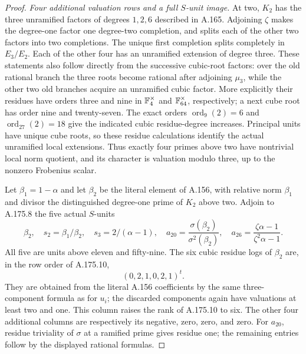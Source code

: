 \begin{proof}
\emph{Four additional valuation rows and a full $S$-unit image.}
At two, $K_2$ has the three unramified factors of degrees $1,2,6$
described in A.165.  Adjoining $\zeta$ makes the degree-one factor
one degree-two completion, and splits each of the other two factors
into two completions.  The unique first completion splits completely
in $E_3/E_2$.  Each of the other four has an unramified extension of
degree three.  These statements also follow directly from the
successive cubic-root factors: over the old rational branch the
three roots become rational after adjoining $\mu_3$, while the
other two old branches acquire an unramified cubic factor.
More explicitly their residues have orders three and nine in
$\mathbb F_4^\times$ and $\mathbb F_{64}^\times$, respectively; a next cube root
has order nine and twenty-seven.  The exact orders
$\operatorname{ord}_9(2)=6$ and $\operatorname{ord}_{27}(2)=18$
give the indicated cubic residue-degree increases.  Principal units
have unique cube roots, so these residue calculations identify the
actual unramified local extensions.
Thus exactly four primes above two have nontrivial local norm
quotient, and its character is valuation modulo three, up to the
nonzero Frobenius scalar.

Let $\beta_1=1-\alpha$ and let $\beta_2$ be the literal element of
A.156, with relative norm $\beta_1$ and divisor the distinguished
degree-one prime of $K_2$ above two.  Adjoin to A.175.8 the five
actual $S$-units
\[
 \beta_2,\quad s_2=\beta_1/\beta_2,\quad
 s_3=2/(\alpha-1),\quad
 a_{20}=\frac{\sigma(\beta_2)}{\sigma^2(\beta_2)},\quad
 a_{26}=\frac{\zeta\alpha-1}{\zeta^2\alpha-1}.
\tag{A.175.12}
\]
All five are units above eleven and fifty-nine.  The six cubic
residue logs of $\beta_2$ are, in the row order of A.175.10,
\[
                   (0,2,1,0,2,1)^t.
\tag{A.175.13}
\]
They are obtained from the literal A.156 coefficients by the same
three-component formula as for $u_i$; the discarded components
again have valuations at least two and one.
This column raises the rank of A.175.10 to six.  The other four
additional columns are respectively its negative, zero, zero, and
zero.  For $a_{20}$, residue triviality of $\sigma$ at a ramified
prime gives residue one; the remaining entries follow by the
displayed rational formulas.


\end{proof}
